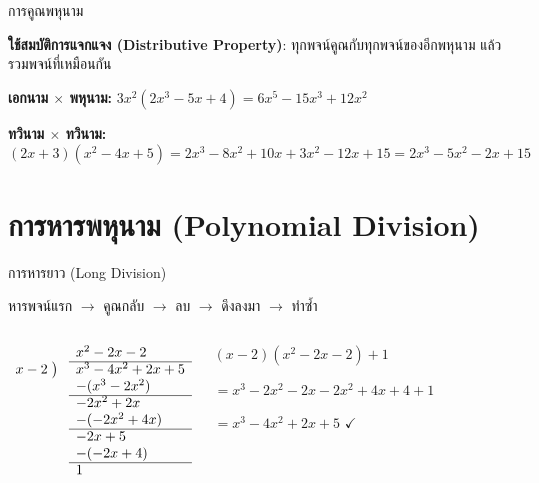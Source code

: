 \documentclass[11pt, aspectratio=169]{beamer}
\begin{document}
\begin{frame}{การคูณพหุนาม}
  \begin{explanation}[วิธีทำ]
    \textbf{ใช้สมบัติการแจกแจง (Distributive Property)}:
    ทุกพจน์คูณกับทุกพจน์ของอีกพหุนาม แล้วรวมพจน์ที่เหมือนกัน
  \end{explanation}

  \begin{exambox}[ตัวอย่าง]
    \textbf{เอกนาม $\times$ พหุนาม:}
    $3x^2(2x^3 - 5x + 4) = 6x^5 - 15x^3 + 12x^2$

    \medskip
    \textbf{ทวินาม $\times$ ทวินาม:}
    $(2x+3)(x^2-4x+5) = 2x^3 -8x^2 +10x +3x^2 -12x +15
    = 2x^3 -5x^2 -2x +15$
  \end{exambox}
\end{frame}

\section{การหารพหุนาม (Polynomial Division)}

\begin{frame}{การหารยาว (Long Division)}
  \begin{explanation}
    หารพจน์แรก $\rightarrow$ คูณกลับ $\rightarrow$ ลบ $\rightarrow$ ดึงลงมา $\rightarrow$ ทำซํ้า
  \end{explanation}
  \begin{columns}[T]
        \begin{exambox}
        \[
        \begin{array}{rl}
          & x^2 - 2x - 2 \\
          \cline{2-2}
          x - 2 \;\big)\; & x^3 - 4x^2 + 2x + 5 \\
          & -(x^3 - 2x^2) \\
          \cline{2-2}
          & -2x^2 + 2x \\
          & -(-2x^2 + 4x) \\
          \cline{2-2}
          & -2x + 5 \\
          & -(-2x + 4) \\
          \cline{2-2}
          & 1
        \end{array}
        \]
      \end{exambox}

    \begin{intuition}[ตรวจคำตอบ]

        $(x-2)(x^2-2x-2) + 1$

        $= x^3 - 2x^2 - 2x - 2x^2 + 4x + 4 + 1$

        $= x^3 - 4x^2 + 2x + 5$ \quad $\checkmark$
      \end{intuition}
  \end{columns}
\end{frame}
\end{document}
